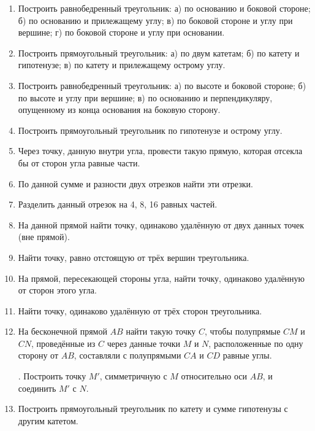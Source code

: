 {\begin{enumerate}
\item
Построить равнобедренный треугольник:
а) по основанию и боковой стороне;
б) по основанию и прилежащему углу;
в) по боковой стороне и углу при вершине;
г) по боковой стороне и углу при основании.

\item
Построить прямоугольный треугольник:
а) по двум катетам;
б) по катету и гипотенузе;
в) по катету и прилежащему острому углу.

\item
Построить равнобедренный треугольник:
а) по высоте и боковой стороне;
б) по высоте и углу при вершине;
в) по основанию и перпендикуляру, опущенному из конца основания на боковую сторону.

\item
Построить прямоугольный треугольник по гипотенузе и острому углу.

\item
Через точку, данную внутри угла, провести такую прямую, которая отсекла бы от сторон угла равные части.

\item
По данной сумме и разности двух отрезков найти эти отрезки.

\item
Разделить данный отрезок на 4, 8, 16 равных частей.

\item
На данной прямой найти точку, одинаково удалённую от двух данных точек (вне прямой).

\item
Найти точку, равно отстоящую от трёх вершин треугольника.

\item
На прямой, пересекающей стороны угла, найти точку, одинаково удалённую от сторон этого угла.

\item
Найти точку, одинаково удалённую от трёх сторон треугольника.

\item
На бесконечной прямой $AB$ найти такую точку $C$, чтобы полупрямые $CM$ и $CN$, проведённые из $C$ через данные точки $M$ и $N$, расположенные по одну сторону от $AB$, составляли с полупрямыми $CA$ и $CD$ равные углы.

\smallskip
{}.
Построить точку $M'$, симметричную с $M$ относительно оси $AB$, и соединить $M'$ с $N$.

\item
Построить прямоугольный треугольник по катету и сумме гипотенузы с другим катетом.


\end{enumerate}}
